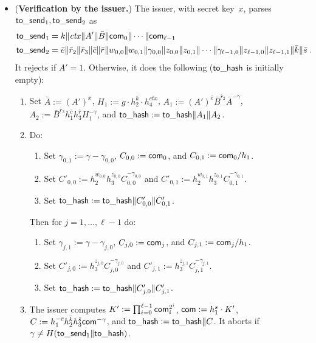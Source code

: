 \documentclass[11pt]{article}
\def\com{{\sf com}}
\def\send{{\sf to}\mbox{\_}{\sf send}}
\def\hash{{\sf to}\mbox{\_}{\sf hash}}
\begin{document}
\begin{itemize}
\begin{enumerate}
    \end{enumerate}
            \item ({\bf Verification by the issuer.}) The issuer, with secret key~$x$, parses $\send_1, \send_2$ as
            \begin{eqnarray*} & \send_1 = k\|\mathit{ctx}\|A'\|\bar B\|\com_0\|\cdots\|\com_{\ell-1} & \\
            &\send_2 = \bar e \| \bar r_2\|\bar r_3\|\bar c \| \bar r\| w_{0,0}\|w_{0,1}\| \gamma_{0,0}\|z_{0,0}\|z_{0,1}\|\cdots \| \gamma_{\ell-1,0}\|z_{\ell-1,0}\|z_{\ell-1,1}\|\bar k\|\bar s \; .&
            \end{eqnarray*}
It rejects if $A'=1$. Otherwise, it does the following ($\hash$ is initially empty):
\begin{enumerate}
    \item Set $\bar A:=(A')^x$, $H_1:=g \cdot h_2^k \cdot h_4^{\mathit{ctx}}$, $A_1:= (A')^{\bar e} \bar B^{\bar r_2} \bar A^{-\gamma}$, $A_2:= \bar B^{\bar r_3} h_1^{\bar c} h_3^{\bar r} H_1^{-\gamma}$, and $\hash:=\hash\|A_1\|A_2$. 
    \item Do:
           \begin{enumerate}
           \item Set $\gamma_{0,1}:=\gamma-\gamma_{0,0}$, $C_{0,0}:=\com_0$, and  $C_{0,1}:=\com_0/h_1$.
           \item Set $C'_{0,0}:=h_2^{w_{0,0}} h_3^{z_{0,0}} C_{0,0}^{-\gamma_{0,0}}$ and $C'_{0,1}:=h_2^{w_{0,1}} h_3^{z_{0,1}}C_{0,1}^{-\gamma_{0,1}}$.
           \item Set $\hash:=\hash\|C'_{0,0}\|C'_{0,1}$.
       \end{enumerate}
       Then for $j=1, \ldots, \ell-1$ do:
              \begin{enumerate}
           \item Set $\gamma_{j,1}:=\gamma-\gamma_{j,0}$, $C_{j,0}:=\com_j$, and  $C_{j,1}:=\com_j/h_1$.
           \item Set $C'_{j,0}:=h_3^{z_{j,0}} C_{j,0}^{-\gamma_{j,0}}$ and $C'_{j,1}:=h_3^{z_{j,1}}C_{j,1}^{-\gamma_{j,1}}$.
           \item Set $\hash:=\hash\|C'_{j,0}\|C'_{j,1}$.
       \end{enumerate}
       \item The issuer computes $K':=\prod_{i=0}^{\ell-1} \com_i^{2^i}$, $\com:=h_1^s\cdot K'$, $C:=h_1^{-\bar c} h_2^{\bar k} h_3^{\bar s} \com^{-\gamma}$, and $\hash:=\hash\|C$. It aborts if $\gamma \neq H(\send_1\|\hash)$.
\end{enumerate}


\end{itemize}
\end{document}
